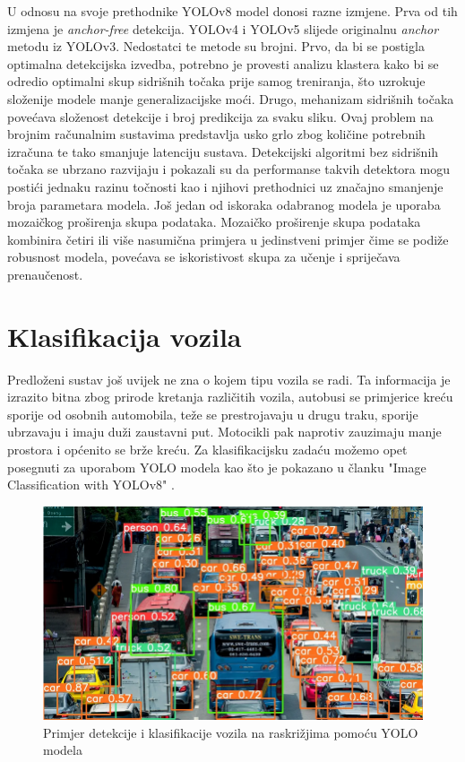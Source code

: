 \documentclass[seminarski, times, utf8]{fer}
\begin{document}
U odnosu na svoje prethodnike YOLOv8 model donosi razne izmjene. Prva od tih izmjena je \textit{anchor-free} detekcija.
YOLOv4 i YOLOv5 slijede originalnu \textit{anchor} metodu iz YOLOv3. Nedostatci te metode su brojni. Prvo, da bi se postigla optimalna detekcijska izvedba, potrebno je provesti analizu klastera kako bi se odredio optimalni skup sidrišnih točaka prije samog treniranja, što uzrokuje složenije modele manje generalizacijske moći. Drugo, mehanizam sidrišnih točaka povećava složenost detekcije i broj predikcija za svaku sliku. Ovaj problem na brojnim računalnim sustavima predstavlja usko grlo zbog količine potrebnih izračuna te tako smanjuje latenciju sustava.
Detekcijski algoritmi bez sidrišnih točaka se ubrzano razvijaju i pokazali su da performanse takvih detektora mogu postići jednaku razinu točnosti kao i njihovi prethodnici uz značajno smanjenje broja parametara modela. \citep{yolox2021}
Još jedan od iskoraka odabranog modela je uporaba mozaičkog proširenja skupa podataka. Mozaičko proširenje skupa podataka kombinira četiri ili više nasumična primjera u jedinstveni primjer čime se podiže robusnost modela, povećava se iskoristivost skupa za učenje i spriječava prenaučenost. \citep{torres2024yolov8mosaic}
\section{Klasifikacija vozila}
Predloženi sustav još uvijek ne zna o kojem tipu vozila se radi. Ta informacija je izrazito bitna zbog prirode kretanja različitih vozila, autobusi se primjerice kreću sporije od osobnih automobila, teže se prestrojavaju u drugu traku, sporije ubrzavaju i imaju duži zaustavni put. Motocikli pak naprotiv zauzimaju manje prostora i općenito se brže kreću.
Za klasifikacijsku zadaću možemo opet posegnuti za uporabom YOLO modela kao što je pokazano u članku  "Image Classification with YOLOv8" \cite{kalra2024image}. 
\begin{figure}[H]
   \centering
   \includegraphics[width=0.7\linewidth]{slike/img1.png}
   \caption{Primjer detekcije i klasifikacije vozila na raskrižjima pomoću YOLO modela}
   \label{fig:detection_and_classification}
\end{figure}
\end{document}
